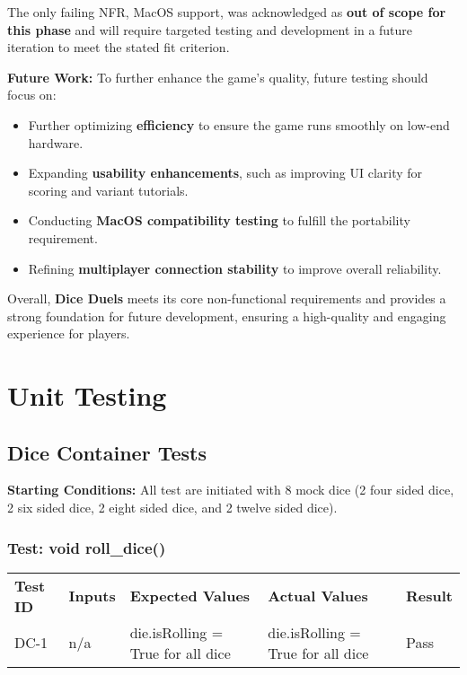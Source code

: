 \documentclass[12pt, titlepage]{article}
\begin{document}
The only failing NFR, MacOS support, was acknowledged as \textbf{out of scope for this phase} and will require targeted testing and development in a future iteration to meet the stated fit criterion.

\textbf{Future Work:}  
To further enhance the game’s quality, future testing should focus on:
\begin{itemize}
    \item Further optimizing \textbf{efficiency} to ensure the game runs smoothly on low-end hardware.
    \item Expanding \textbf{usability enhancements}, such as improving UI clarity for scoring and variant tutorials.
    \item Conducting \textbf{MacOS compatibility testing} to fulfill the portability requirement.
    \item Refining \textbf{multiplayer connection stability} to improve overall reliability.
\end{itemize}

Overall, \textbf{Dice Duels} meets its core non-functional requirements and provides a strong foundation for future development, ensuring a high-quality and engaging experience for players.




\newpage
\section{Unit Testing}

\subsection{Dice Container Tests}

\textbf{Starting Conditions:} All test are initiated with 8 mock dice (2 four sided dice, 2 six sided dice, 2 eight sided dice, and 2 twelve sided dice).

\subsubsection{Test: void roll\_dice()}
\begin{tabularx}{\textwidth}{|p{2cm}|p{3.5cm}|p{4cm}|p{4cm}|p{1.5cm}|}
    \cline{1-5}
    \textbf{Test ID} & \textbf{Inputs} & \textbf{Expected Values} & \textbf{Actual Values} & \textbf{Result} \\
    \cline{1-5}
    DC-1 & n/a & die.isRolling = True for all dice & die.isRolling = True for all dice & Pass \\
    \cline{1-5}
\end{tabularx}
\end{document}
